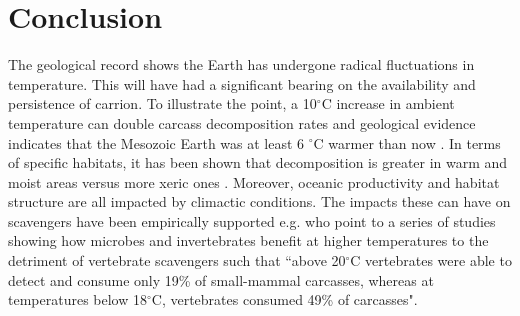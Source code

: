 \documentclass[a4paper,12pt]{article}
\begin{document}
\section*{Conclusion} 
The geological record shows the Earth has undergone radical fluctuations in temperature.
This will have had a significant bearing on the availability and persistence of carrion.
To illustrate the point, a 10$^{\circ}$C increase in ambient temperature can double carcass decomposition rates \citep{parmenter2009carrion} and geological evidence indicates that the Mesozoic Earth was at least 6 $^{\circ}$C warmer than now \citep{sellwood2006mesozoic}.
In terms of specific habitats, it has been shown that decomposition is greater in warm and moist areas versus more xeric ones \citep{beasley2015vertebrates}.
Moreover, oceanic productivity and habitat structure are all impacted by climactic conditions.
The impacts these can have on scavengers have been empirically supported e.g.
\cite{beasley2015vertebrates} who point to a series of studies showing how microbes and invertebrates benefit at higher temperatures to the detriment of vertebrate scavengers such that ``above 20$^{\circ}$C vertebrates were able to detect and consume only 19\% of small-mammal carcasses, whereas at temperatures below 18$^{\circ}$C, vertebrates consumed 49\% of carcasses".





 
\end{document}
